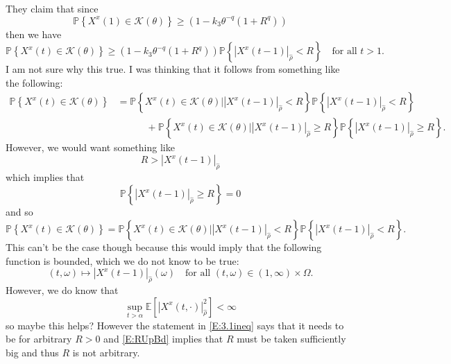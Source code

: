 \documentclass{article}
\numberwithin{equation}{section}
\begin{document}
They claim that since
	\begin{equation}\label{E:KTheta1}
			\mathbb{P}\left\{ X^x(1) \in \mathscr{K}(\theta)  \right\} \ge (1-k_3\theta^{-q}(1+R^q))
	\end{equation}
then we have 
	\begin{equation}\label{E:KThetaRecursive}
		\mathbb{P}\left\{ X^x(t) \in \mathscr{K}(\theta)  \right\} \ge (1-k_3\theta^{-q}(1+R^q)) \mathbb{P}\left\{ \left| X^x(t-1) \right|_{\hat{\rho}} < R  \right\} \quad \text{for all } t>1.
	\end{equation}
I am not sure why this true. I was thinking that it follows from something like the following:
	\begin{align*}
			\mathbb{P}\left\{ X^x(t) \in \mathscr{K}(\theta)  \right\}  &= 	\mathbb{P}\left\{ X^x(t) \in \mathscr{K}(\theta) \bigg\vert  \left| X^x(t-1) \right|_{\hat{\rho}} < R  \right\} \mathbb{P}\left\{ \left| X^x(t-1) \right|_{\hat{\rho}} < R  \right\} 
			\\ &\quad \quad \quad + \mathbb{P}\left\{ X^x(t) \in \mathscr{K}(\theta) \bigg \vert \left| X^x(t-1) \right|_{\hat{\rho}} \ge R  \right\} \mathbb{P}\left\{ \left| X^x(t-1) \right|_{\hat{\rho}} \ge R  \right\}.
	\end{align*}
However, we would want something like 
	\begin{equation} \label{E:RUpBd}
		R > \left| X^x(t-1) \right|_{\hat{\rho}}
	\end{equation}
 which implies that 
	\[
		 \mathbb{P}\left\{ \left| X^x(t-1) \right|_{\hat{\rho}} \ge R  \right\} = 0
	\]
and so 
	\begin{equation}\label{E:KThetaConditional}
			\mathbb{P}\left\{ X^x(t) \in \mathscr{K}(\theta)  \right\}  = 	\mathbb{P}\left\{ X^x(t) \in \mathscr{K}(\theta) \bigg\vert  \left| X^x(t-1) \right|_{\hat{\rho}} < R  \right\} \mathbb{P}\left\{ \left| X^x(t-1) \right|_{\hat{\rho}} < R  \right\}.
	\end{equation}
This can't be the case though because this would imply that the following function is bounded, which we do not know to be true:
	\[
		(t,\omega) \mapsto \left| X^x(t-1) \right|_{\hat{\rho}}(\omega) \quad \text{for all } 	(t,\omega) \in (1,\infty) \times \Omega.
	\]
However, we do know that 
	\[
		\sup_{t>\alpha} \mathbb{E}\left[ |X^x(t,\cdot)|_{\hat \rho}^2 \right] < \infty 
	\]
so maybe this helps? However the statement in \eqref{E:3.1ineq} says that it needs to be for arbitrary $R>0$ and \eqref{E:RUpBd} implies that $R$ must be taken sufficiently big and thus $R$ is not arbitrary. 
\end{document}
